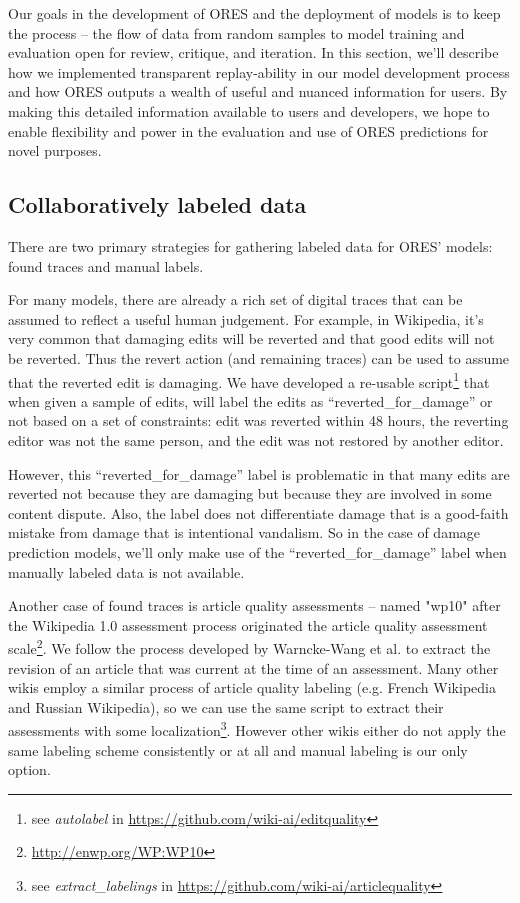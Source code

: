 Our goals in the development of ORES and the deployment of models is to keep the process -- the flow of data from random samples to model training and evaluation open for review, critique, and iteration.  In this section, we'll describe how we implemented transparent replay-ability in our model development process and how ORES outputs a wealth of useful and nuanced information for users.  By making this detailed information available to users and developers, we hope to enable flexibility and power in the evaluation and use of ORES predictions for novel purposes.

\subsection{Collaboratively labeled data}
There are two primary strategies for gathering labeled data for ORES' models: found traces and manual labels.

 For many models, there are already a rich set of digital traces that can be assumed to reflect a useful human judgement.  For example, in Wikipedia, it's very common that damaging edits will be reverted and that good edits will not be reverted.  Thus the revert action (and remaining traces) can be used to assume that the reverted edit is damaging.  We have developed a re-usable script\footnote{see \emph{autolabel} in \url{https://github.com/wiki-ai/editquality}} that when given a sample of edits, will label the edits as ``reverted\_for\_damage'' or not based on a set of constraints: edit was reverted within 48 hours, the reverting editor was not the same person, and the edit was not restored by another editor.

However, this ``reverted\_for\_damage'' label is problematic in that many edits are reverted not because they are damaging but because they are involved in some content dispute.  Also, the label does not differentiate damage that is a good-faith mistake from damage that is intentional vandalism.  So in the case of damage prediction models, we'll only make use of the ``reverted\_for\_damage'' label when manually labeled data is not available.

Another case of found traces is article quality assessments -- named "wp10" after the Wikipedia 1.0 assessment process originated the article quality assessment scale\footnote{\url{http://enwp.org/WP:WP10}}.  We follow the process developed by Warncke-Wang et al.\cite{wang2017english} to extract the revision of an article that was current at the time of an assessment.  Many other wikis employ a similar process of article quality labeling (e.g. French Wikipedia and Russian Wikipedia), so we can use the same script to extract their assessments with some localization\footnote{see \emph{extract\_labelings} in \url{https://github.com/wiki-ai/articlequality}}.  However other wikis either do not apply the same labeling scheme consistently or at all and manual labeling is our only option.


